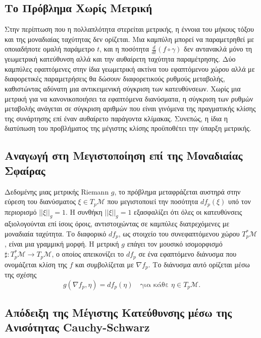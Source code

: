 \documentclass[11pt,a4paper,twoside,openright]{book}
\begin{document}
\subsection{Το Πρόβλημα Χωρίς Μετρική}

Στην περίπτωση που η πολλαπλότητα στερείται μετρικής, η έννοια του μήκους τόξου και της μοναδιαίας ταχύτητας δεν ορίζεται. Μια καμπύλη μπορεί να παραμετρηθεί με οποιαδήποτε ομαλή παράμετρο \(t\), και η ποσότητα \(\frac{d}{dt}(f \circ \gamma)\) δεν αντανακλά μόνο τη γεωμετρική κατεύθυνση αλλά και την αυθαίρετη ταχύτητα παραμέτρησης. Δύο καμπύλες εφαπτόμενες στην ίδια γεωμετρική ακτίνα του εφαπτόμενου χώρου αλλά με διαφορετικές παραμετρήσεις θα δώσουν διαφορετικούς ρυθμούς μεταβολής, καθιστώντας αδύνατη μια αντικειμενική σύγκριση των κατευθύνσεων. Χωρίς μια μετρική για να κανονικοποιήσει τα εφαπτόμενα διανύσματα, η σύγκριση των ρυθμών μεταβολής ανάγεται σε σύγκριση αριθμών που είναι γινόμενα της πραγματικής κλίσης της συνάρτησης επί έναν αυθαίρετο παράγοντα κλίμακας. Συνεπώς, η ίδια η διατύπωση του προβλήματος της μέγιστης κλίσης προϋποθέτει την ύπαρξη μετρικής.

\subsection{Αναγωγή στη Μεγιστοποίηση επί της Μοναδιαίας Σφαίρας}

Δεδομένης μιας μετρικής Riemann \(g\), το πρόβλημα μεταφράζεται αυστηρά στην εύρεση του διανύσματος \(\xi \in T_p\mathcal{M}\) που μεγιστοποιεί την ποσότητα \(df_p(\xi)\) υπό τον περιορισμό \(||\xi||_g = 1\). Η συνθήκη \(||\xi||_g = 1\) εξασφαλίζει ότι όλες οι κατευθύνσεις αξιολογούνται επί ίσοις όροις, αντιστοιχώντας σε καμπύλες διατρεχόμενες με μοναδιαία ταχύτητα. Το διαφορικό \(df_p\), ως στοιχείο του συνεφαπτόμενου χώρου \(T_p^*\mathcal{M}\), είναι μια γραμμική μορφή. Η μετρική \(g\) επάγει τον μουσικό ισομορφισμό \(\sharp: T_p^*\mathcal{M} \to T_p\mathcal{M}\), ο οποίος απεικονίζει το \(df_p\) σε ένα εφαπτόμενο διάνυσμα που ονομάζεται κλίση της \(f\) και συμβολίζεται με \(\nabla f_p\). Το διάνυσμα αυτό ορίζεται μέσω της σχέσης
\[
g(\nabla f_p, \eta) = df_p(\eta) \quad \text{για κάθε } \eta \in T_p\mathcal{M}.
\]

\subsection{Απόδειξη της Μέγιστης Κατεύθυνσης μέσω της Ανισότητας Cauchy-Schwarz}
\end{document}
